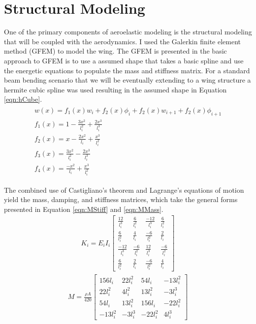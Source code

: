 \documentclass[11pt]{ucthesis}
\begin{document}
\section{Structural Modeling}
One of the primary components of aeroelastic modeling is the structural modeling that will be coupled with the aerodynamics. I used the Galerkin finite element method (GFEM) to model the wing. The GFEM is presented in \cite{fertis1999nonlinear} the basic approach to GFEM is to use a assumed shape that takes a basic spline and use the energetic equations to populate the mass and stiffness matrix. For a standard beam bending scenario that we will be eventually extending to a wing structure a hermite cubic spline was used resulting in the assumed shape in Equation \ref{eqn:hCube}.
\large
\begin{eqnarray}
	\begin{array}{ll}
		w(x) = f_1(x)w_i +f_2(x)\phi_i+f_2(x)w_{i+1}+f_2(x)\phi_{i+1}\\
		f_1(x) = 1-\frac{3x^2}{l_i^2}+\frac{2x^3}{l_i^3}\\
		f_2(x) = x-\frac{2x^2}{l_i}+\frac{x^3}{l_i^2}\\
		f_3(x) = \frac{3x^2}{l_i^2}-\frac{2x^3}{l_i^3}\\
		f_4(x) = \frac{-x^2}{l_i}+\frac{x^3}{l_i^2}
	\end{array}
\label{eqn:hCube}
\end{eqnarray}
\normalsize

The combined use of Castigliano's theorem and Lagrange's equations of motion yield the mass, damping, and stiffness matrices, which take the general forms presented in Equation \ref{eqn:MStiff} and \ref{eqn:MMass}. 
\begin{eqnarray}
K_i = E_iI_i \begin{bmatrix} 
\frac{12}{l_i^3} & \frac{6}{l_i^2}&\frac{-12}{l_i^3}&\frac{6}{l_i^2}\\ 
\frac{6}{l_i^2}&\frac{4}{l_i}&\frac{-6}{l_i^2}&\frac{2}{l_i}\\ 
\frac{-12}{l_i^3}&\frac{-6}{l_i^2}&\frac{12}{l_i^3}&\frac{-6}{l_i^2}\\ 
\frac{6}{l_i^2}&\frac{2}{l_i}&\frac{-6}{l_i^2}&\frac{4}{l_i}
\end{bmatrix}
\label{eqn:MStiff}
\end{eqnarray}
\begin{eqnarray}
M =  \frac{\rho A}{420}\begin{bmatrix} 
156l_i & 22l_i^2&54l_i&-13l_i^2\\ 
22l_i^2&4l_i^2&13l_i^2&-3l_i^3\\ 
54l_i&13l_i^2&156l_i&-22l_i^2\\
-13l_i^2&-3l_i^3&-22l_i^2&4l_i^3
\end{bmatrix}
\label{eqn:MMass}
\end{eqnarray}
\end{document}
